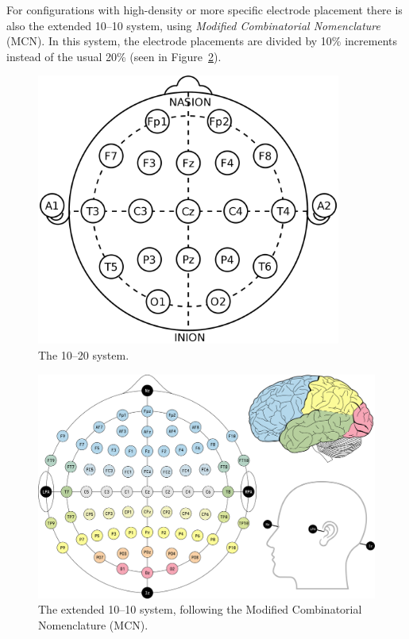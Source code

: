    For configurations with high-density or more specific electrode placement there is also the extended 10--10 system, using \emph{Modified Combinatorial Nomenclature} (MCN). In this system, the electrode placements are divided by 10\% increments instead of the usual 20\% (seen in Figure~\ref{fig:1010}).

    \begin{figure}
        \begin{center}
            \includegraphics[width=10cm]{img/1020system.png}
        \end{center}
        \caption{The 10–20 system.}\label{fig:1020}
    \end{figure}

    \begin{landscape}
        \begin{figure}
            \begin{center}
                \includegraphics[width=20cm]{img/1020system-extended-with-extra-info.png}
            \end{center}
            \caption{The extended 10–10 system, following the Modified Combinatorial Nomenclature (MCN).}\label{fig:1010}
        \end{figure}
    \end{landscape}

